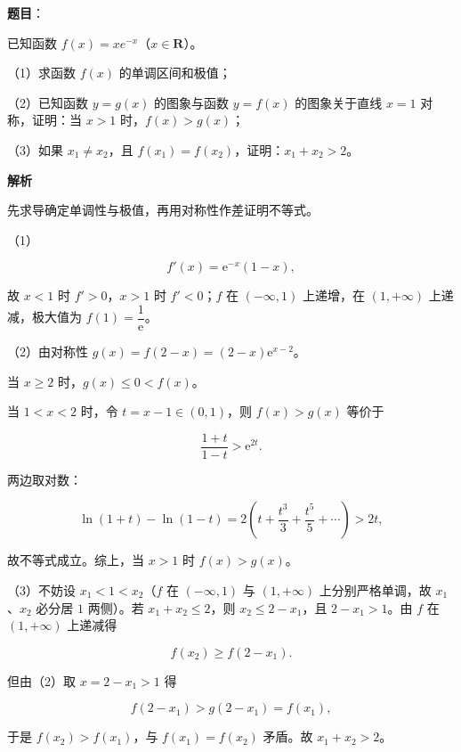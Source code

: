\begin{answer}

\textbf{题目}：

已知函数 $f(x)=xe^{-x}$（$x\in\mathbf R$）。

（1）求函数 $f(x)$ 的单调区间和极值；

（2）已知函数 $y=g(x)$ 的图象与函数 $y=f(x)$ 的图象关于直线 $x=1$ 对称，证明：当 $x>1$ 时，$f(x)>g(x)$；

（3）如果 $x_1\neq x_2$，且 $f(x_1)=f(x_2)$，证明：$x_1+x_2>2$。

\textbf{解析}

先求导确定单调性与极值，再用对称性作差证明不等式。

（1）

\nopagebreak[4]
\[f'(x)=\mathrm e^{-x}(1-x),\]

故 $x<1$ 时 $f'>0$，$x>1$ 时 $f'<0$；$f$ 在 $(-\infty,1)$ 上递增，在 $(1,+\infty)$ 上递减，极大值为 $f(1)=\dfrac1{\mathrm e}$。

（2）由对称性 $g(x)=f(2-x)=(2-x)\mathrm e^{x-2}$。

当 $x\geqslant2$ 时，$g(x)\leqslant0<f(x)$。

当 $1<x<2$ 时，令 $t=x-1\in(0,1)$，则 $f(x)>g(x)$ 等价于

\nopagebreak[4]
\[\frac{1+t}{1-t}>\mathrm e^{2t}.\]

两边取对数：

\nopagebreak[4]
\[\ln(1+t)-\ln(1-t)=2\left(t+\frac{t^3}3+\frac{t^5}5+\cdots\right)>2t,\]

故不等式成立。综上，当 $x>1$ 时 $f(x)>g(x)$。

（3）不妨设 $x_1<1<x_2$（$f$ 在 $(-\infty,1)$ 与 $(1,+\infty)$ 上分别严格单调，故 $x_1$、$x_2$ 必分居 $1$ 两侧）。若 $x_1+x_2\leqslant2$，则 $x_2\leqslant2-x_1$，且 $2-x_1>1$。由 $f$ 在 $(1,+\infty)$ 上递减得

\nopagebreak[4]
\[f(x_2)\geqslant f(2-x_1).\]

但由（2）取 $x=2-x_1>1$ 得

\nopagebreak[4]
\[f(2-x_1)>g(2-x_1)=f(x_1),\]

于是 $f(x_2)>f(x_1)$，与 $f(x_1)=f(x_2)$ 矛盾。故 $x_1+x_2>2$。


\end{answer}
